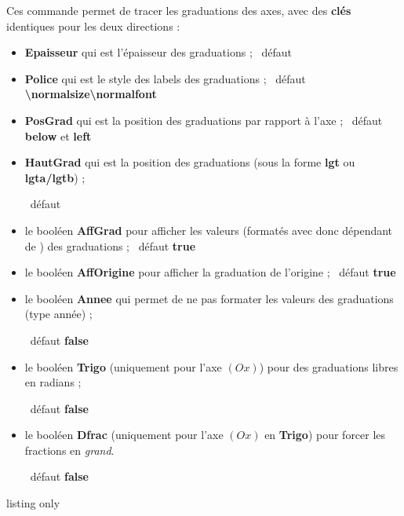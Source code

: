\documentclass[a4paper,french,11pt]{article}
\newcommand\ctex[1]{\tcbox[vignettelatex]{#1}}
\newcommand\cmaj[1]{%
	{\tcbox[vignetteMaJ]{#1}\xspace}%
}
\newcommand\Cle[1]{{\bfseries\sffamily\textlangle #1\textrangle}}
\begin{document}
\begin{cautionblock}
Ces commande permet de tracer les graduations des axes, avec des \Cle{clés} identiques pour les deux directions :

\begin{itemize}
	\item \Cle{Epaisseur} qui est l'épaisseur des graduations ; \hfill~défaut \Cle{1pt}
	\item \Cle{Police} qui est le style des labels des graduations ; \hfill~défaut \Cle{\textbackslash{}normalsize\textbackslash{}normalfont}
	\item \Cle{PosGrad} qui est la position des graduations par rapport à l'axe ; \hfill~défaut \Cle{below} et \Cle{left}
	\item \Cle{HautGrad} qui est la position des graduations (sous la forme \Cle{lgt} ou \Cle{lgta/lgtb}) ;
	
	\hfill~défaut \Cle{4pt}
	\item le booléen \Cle{AffGrad} pour afficher les valeurs (formatés avec \ctex{num} donc dépendant de \ctex{sisetup}) des graduations  ; \hfill~défaut \Cle{true}
	\item le booléen \Cle{AffOrigine} pour afficher la graduation de l'origine ; \hfill~défaut \Cle{true}
	\item le booléen \Cle{Annee} qui permet de ne pas formater les valeurs des graduations (type \textsf{année}) ;
	
	\hfill~défaut \Cle{false}
	\item \cmaj{2.5.6} le booléen \Cle{Trigo} (uniquement pour l'axe $(Ox)$) pour des graduations libres en radians ;
	
	\hfill~défaut \Cle{false}
	\item \cmaj{2.5.6} le booléen \Cle{Dfrac} (uniquement pour l'axe $(Ox)$ en \Cle{Trigo}) pour forcer les fractions en \textit{grand}.
	
	\hfill~défaut \Cle{false}
\end{itemize}
\vspace*{-\baselineskip}\leavevmode
\end{cautionblock}

\begin{PresCodeTexPL}{listing only}
\end{PresCodeTexPL}
\end{document}

